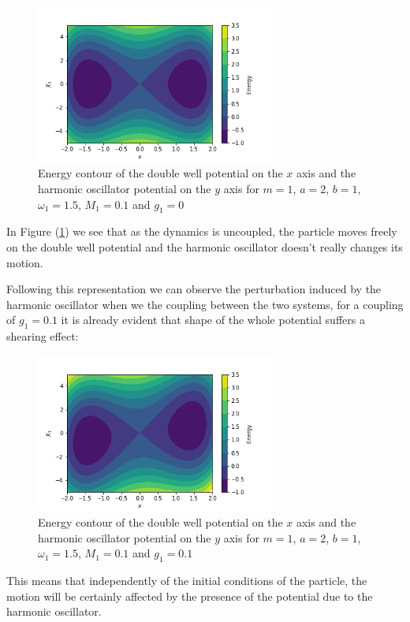 \begin{figure}[H]
\centering
\includegraphics[width=0.7\textwidth]{Figures/energy_contour.png}
\caption{Energy contour of the double well potential on the $x$ axis and the harmonic oscillator potential on the $y$ axis for $m=1$, $a=2$, $b=1$, $\omega_1=1.5$, $M_1=0.1$ and $g_1=0$\label{fig:contour_g0}}

\end{figure}

In Figure (\ref{fig:contour_g0}) we see that as the dynamics is uncoupled, the particle moves freely on the double well potential and the harmonic oscillator doesn't really changes its motion. \par 

Following this representation we can observe the perturbation induced by the harmonic oscillator when we  the coupling between the two systems, for a coupling of $g_1=0.1$ it is already evident that shape of the whole potential suffers a shearing effect:

\begin{figure}[H]
\centering
\includegraphics[width=0.7\textwidth]{Figures/energy_contour_coupled01.png}
\caption{Energy contour of the double well potential on the $x$ axis and the harmonic oscillator potential on the $y$ axis for $m=1$, $a=2$, $b=1$, $\omega_1=1.5$, $M_1=0.1$ and $g_1=0.1$\label{fig:contour_g01}}

\end{figure}
This means that independently of the initial conditions of the particle, the motion will be certainly affected by the presence of the potential due to the harmonic oscillator.\par 

